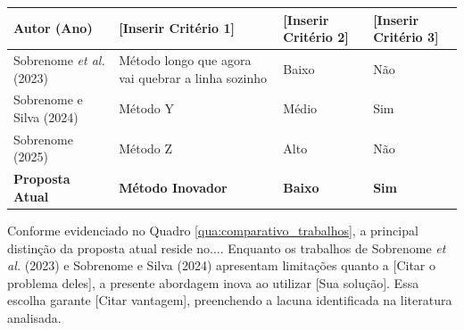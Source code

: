 \begin{quadro}[htb]
    \centering
    \caption{Comparativo entre os trabalhos correlatos e a solução proposta}
    \vspace{0.2cm}
    
    \begin{tabularx}{\textwidth}{|l | X | X | X|}
        \hline
        \textbf{Autor (Ano)} & \textbf{[Inserir Critério 1]} & \textbf{[Inserir Critério 2]} & \textbf{[Inserir Critério 3]} \\
        \hline
        Sobrenome \emph{et al.} (2023) & Método longo que agora vai quebrar a linha sozinho & Baixo & Não \\
        \hline
        Sobrenome e Silva (2024)& Método Y & Médio & Sim \\
        \hline
        Sobrenome (2025)        & Método Z & Alto  & Não \\
        \hline
        \textbf{Proposta Atual} & \textbf{Método Inovador} & \textbf{Baixo} & \textbf{Sim} \\
        \hline
    \end{tabularx}
    
    \label{qua:comparativo_trabalhos}
\end{quadro}

Conforme evidenciado no Quadro \ref{qua:comparativo_trabalhos}, a principal distinção da proposta atual reside no.... Enquanto os trabalhos de Sobrenome \emph{et al.} (2023) e Sobrenome e Silva (2024) apresentam limitações quanto a [Citar o problema deles], a presente abordagem inova ao utilizar [Sua solução]. Essa escolha garante [Citar vantagem], preenchendo a lacuna identificada na literatura analisada.

